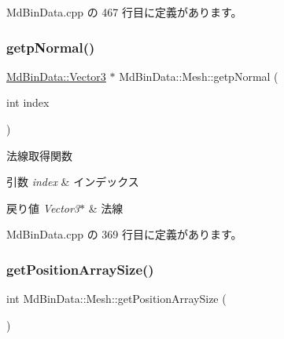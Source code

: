  Md\+Bin\+Data.\+cpp の 467 行目に定義があります。

\mbox{\label{class_md_bin_data_1_1_mesh_ac6f223a7f0d6e0c9f1725ac2c00b1fac}} 
\subsubsection{\texorpdfstring{getp\+Normal()}{getpNormal()}}
{\footnotesize\ttfamily \mbox{\hyperlink{class_md_bin_data_1_1_vector3}{Md\+Bin\+Data\+::\+Vector3}} $\ast$ Md\+Bin\+Data\+::\+Mesh\+::getp\+Normal (\begin{DoxyParamCaption}\item[{int}]{index }\end{DoxyParamCaption})}



法線取得関数 


\begin{DoxyParams}{引数}
{\em index} & インデックス \\
\hline
\end{DoxyParams}

\begin{DoxyRetVals}{戻り値}
{\em Vector3$\ast$} & 法線 \\
\hline
\end{DoxyRetVals}


 Md\+Bin\+Data.\+cpp の 369 行目に定義があります。

\mbox{\label{class_md_bin_data_1_1_mesh_aa4f3f5971f94e1084b2b6f4777d48ad7}} 
\subsubsection{\texorpdfstring{get\+Position\+Array\+Size()}{getPositionArraySize()}}
{\footnotesize\ttfamily int Md\+Bin\+Data\+::\+Mesh\+::get\+Position\+Array\+Size (\begin{DoxyParamCaption}{ }\end{DoxyParamCaption})}



